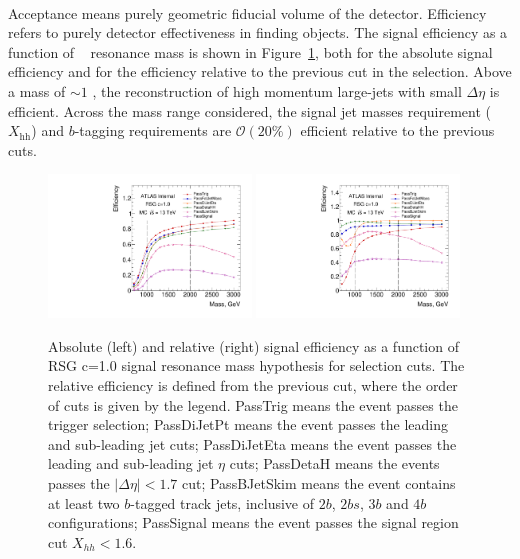 \paragraph{}
Acceptance means purely geometric fiducial volume of the detector. Efficiency refers to purely detector effectiveness in finding objects.
The signal efficiency as a function of \Grav~ resonance mass is shown in Figure~\ref{fig:boosted-selection-efficiency}, both for the absolute signal efficiency and for the efficiency relative to the previous cut in the selection.
Above a mass of $\sim\!1$ \TeV, the reconstruction of high momentum large-\R jets with small $\Delta\eta$ is efficient. 
Across the mass range considered, the signal jet masses requirement ($X_\text{hh}$) and $b$-tagging requirements are $\mathcal{O}(20\%)$ efficient relative to the previous cuts.

\begin{figure}
\begin{center}
\includegraphics[width=0.48\textwidth,angle=-90]{figures/boosted/SigEff/evtsel_Moriond_Efficiency_PreSel.pdf}
\includegraphics[width=0.48\textwidth,angle=-90]{figures/boosted/SigEff/evtsel_Moriond_Efficiency_PreSel_rel.pdf}
  \caption{Absolute (left) and relative (right) signal efficiency as a function of RSG c=1.0 signal resonance mass hypothesis for selection cuts. The relative efficiency is defined from the previous cut, where the order of cuts is given by the legend. PassTrig means the event passes the trigger selection; PassDiJetPt means the event passes the leading and sub-leading jet \pt cuts; PassDiJetEta means the event passes the leading and sub-leading jet $\eta$ cuts; PassDetaH means the events passes the $|\Delta \eta| < 1.7$ cut; PassBJetSkim means the event contains at least two $b$-tagged track jets, inclusive of $2b$, $2bs$, $3b$ and $4b$ configurations; PassSignal means the event passes the signal region cut $X_{hh} < 1.6$.}
  \label{fig:boosted-selection-efficiency}
\end{center}
\end{figure}

